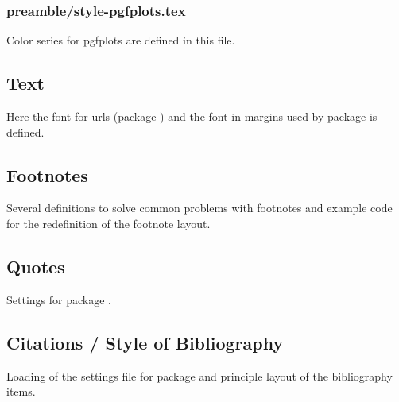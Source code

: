 
\subsubsection{preamble/style-pgfplots.tex}

Color series for pgfplots are defined in this file.


\subsection{Text}

Here the font for urls (package ) and the font in margins used by package  is defined.


\subsection{Footnotes}

Several definitions to solve common problems with footnotes and example code for the redefinition of the footnote layout.


\subsection{Quotes}

Settings for package .


\subsection{Citations / Style of Bibliography}

Loading of the settings file for package   and principle layout of the bibliography items.

